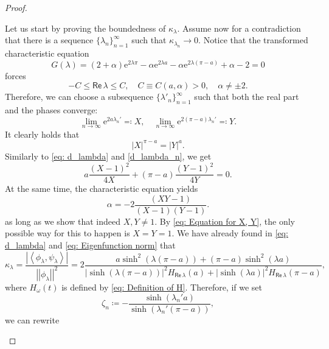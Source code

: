\documentclass[11pt, a4paper,reqno]{amsart}
\theoremstyle{plain}
\theoremstyle{definition}
\theoremstyle{remark}
\newcommand{\inner}[2]{\left\langle{#1}, {#2}\right\rangle}
\newcommand{\norm}[1]{\left|\left|#1\right|\right|}
\renewcommand{\leq}{\leqslant}	\renewcommand{\geq}{\geqslant}
\newcommand{\1}{\mathds 1}
\renewcommand{\Re}{\mathsf{Re}\,}
\begin{document}
\begin{proof}
\begin{enumerate}
        Let us start by proving the boundedness of $\kappa_\lambda$. Assume now for a contradiction that there is a sequence $\{\lambda_n\}_{n=1}^\infty$ such that $\kappa_{\lambda_n} \to 0$. Notice that the transformed characteristic equation
        \[
        G(\lambda) = (2+\alpha)\mathrm{e}^{2\lambda\pi} - \alpha\mathrm{e}^{2\lambda a} - \alpha \mathrm{e}^{2\lambda(\pi-a)} + \alpha - 2 = 0
        \]
        forces
        \begin{equation}
        -C \leq \Re \lambda \leq C, \quad C \equiv C(a, \alpha) > 0, \quad \alpha \neq \pm 2.
        \label{eq: Real part restriction}
        \end{equation}
        Therefore, we can choose a subsequence $\{\lambda'_n\}_{n=1}^\infty$ such that both the real part and the phases converge:
        \[
        \lim_{n\to\infty}\mathrm{e}^{2a\lambda_n'} \eqqcolon X, \quad \lim_{n\to\infty}\mathrm{e}^{2(\pi-a)\lambda_n'} \eqqcolon Y.
        \]
        It clearly holds that 
        \begin{equation}
            |X|^{\pi-a} = |Y|^a.
            \label{eq: Modulus condition}
        \end{equation}
        Similarly to \eqref{eq: d_lambda} and \eqref{d_lambda_n}, we get
        \begin{equation}
        a\frac{(X-1)^2}{4X} + (\pi-a)\frac{(Y-1)^2}{4Y} = 0.
        \label{eq: Equation for X, Y}
        \end{equation}
        At the same time, the characteristic equation yields
        \begin{equation}
        \alpha = -2\frac{(XY-1)}{(X-1)(Y-1)}.
        \label{eq: Equation for X, Y, alpha}
        \end{equation}
        as long as we show that indeed $X, Y \neq 1$. By \eqref{eq: Equation for X, Y}, the only possible way for this to happen is $X = Y = 1$. We have already found in \eqref{eq: d_lambda} and \eqref{eq: Eigenfunction norm} that
        \[
        \kappa_\lambda = \frac{|\inner{\phi_\lambda}{\psi_\lambda}|}{\norm{\phi_\lambda}^2} = 2\frac{a\sinh^2(\lambda(\pi-a)) + (\pi-a)\sinh^2(\lambda a)}{|\sinh(\lambda(\pi-a))|^2H_{\Re\lambda}(a) + |\sinh(\lambda a)|^2H_{\Re \lambda}(\pi-a)},
        \]
        where $H_\omega(t)$ is defined by \eqref{eq: Definition of H}. Therefore, if we set
        \[
        \zeta_n \coloneqq - \frac{\sinh(\lambda_n'a)}{\sinh(\lambda_n'(\pi-a))},
        \]
        we can rewrite
        \begin{equation}

\end{equation}
\end{enumerate}
\end{proof}
\end{document}
